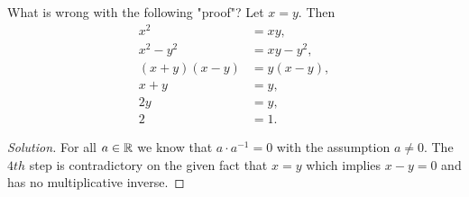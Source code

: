 \begin{exercise}[\textbf{2}]
     What is wrong with the following "proof"? Let $x=y$. Then
     \begin{align*}
         x^2 &= xy, \\
         x^2-y^2 &= xy-y^2, \\
         (x+y)(x-y) &= y(x-y), \\
         x+y &= y, \\
         2y &= y, \\ 
         2 &= 1.    
     \end{align*}
     \begin{proof}[Solution] For all $a \in \mathbb{R}$ we know that $a\cdot a^{-1}=0$
     with the assumption $a\neq 0$. The $4th$ step is contradictory on the given
     fact that $x=y$ which implies $x-y=0$ and has no multiplicative inverse.
    \end{proof}
\end{exercise}
